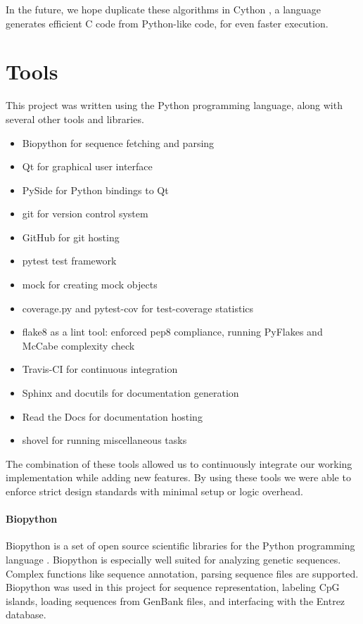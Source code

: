\documentclass{bioinfo}
\begin{document}
In the future, we hope duplicate these algorithms in Cython
\citep{behnel2010cython}, a language generates efficient C code from
Python-like code, for even faster execution.

\section{Tools}

This project was written using the Python programming language, along with several other tools and libraries.

\begin{itemize}
\item Biopython for sequence fetching and parsing
\item Qt for graphical user interface
\item PySide for Python bindings to Qt
\item git for version control system
\item GitHub for git hosting
\item pytest test framework
\item mock for creating mock objects
\item coverage.py and pytest-cov for test-coverage statistics
\item flake8 as a lint tool: enforced pep8 compliance, running PyFlakes and McCabe complexity check
\item Travis-CI for continuous integration
\item Sphinx and docutils for documentation generation
\item Read the Docs for documentation hosting
\item shovel for running miscellaneous tasks
\end{itemize}

The combination of these tools allowed us to continuously integrate our working implementation while adding new features. By using these tools we were able to enforce strict design standards with minimal setup or logic overhead.

\paragraph{Biopython\textcolon}
      Biopython is a set of open source scientific libraries for the Python programming language \citep{pmid19304878}. Biopython is especially well suited for analyzing genetic sequences. Complex functions like sequence annotation, parsing sequence files are supported. Biopython was used in this project for sequence representation, labeling CpG islands, loading sequences from GenBank files, and interfacing with the Entrez database.\\
    
\end{document}
